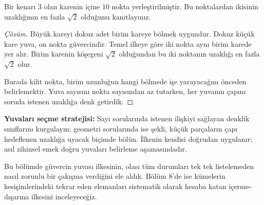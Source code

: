 \begin{example}
Bir kenarı $3$ olan karenin içine $10$ nokta yerleştirilmiştir. Bu noktalardan ikisinin uzaklığının en fazla $\sqrt2$ olduğunu kanıtlayınız.
\end{example}
\begin{proof}[Çözüm]
Büyük kareyi dokuz adet birim kareye bölmek uygundur. Dokuz küçük kare yuva, on nokta güvercindir. Temel ilkeye göre iki nokta aynı birim karede yer alır. Birim karenin köşegeni $\sqrt2$ olduğundan bu iki noktanın uzaklığı en fazla $\sqrt2$ olur.

Burada kilit nokta, birim uzunluğun hangi bölmede işe yarayacağını önceden belirlemektir. Yuva sayısını nokta sayısından az tutarken, her yuvanın çapını soruda istenen uzaklığa denk getirdik.
\end{proof}

\textbf{Yuvaları seçme stratejisi:} Sayı sorularında istenen ilişkiyi sağlayan denklik sınıflarını kurgulayın; geometri sorularında ise şekli, küçük parçaların çapı hedeflenen uzaklığa uyacak biçimde bölün. İlkenin kendisi doğrudan uygulanır; asıl zihinsel emek doğru yuvaları belirleme aşamasındadır.

Bu bölümde güvercin yuvası ilkesinin, olası tüm durumları tek tek listelemeden nasıl zorunlu bir çakışma verdiğini ele aldık. Bölüm 8'de ise kümelerin kesişimlerindeki tekrar eden elemanları sistematik olarak hesaba katan içerme-dışarma ilkesini inceleyeceğiz.
